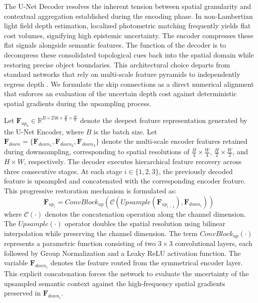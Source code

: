 \documentclass[lettersize,journal]{IEEEtran}
\begin{document}
The U-Net Decoder resolves the inherent tension between spatial granularity and contextual aggregation established during the encoding phase. In non-Lambertian light field depth estimation, localized photometric matching frequently yields flat cost volumes, signifying high epistemic uncertainty. The encoder compresses these flat signals alongside semantic features. The function of the decoder is to decompress these consolidated topological cues back into the spatial domain while restoring precise object boundaries. This architectural choice departs from standard networks that rely on multi-scale feature pyramids to independently regress depth \cite{lin2017}. We formulate the skip connections as a direct numerical alignment that enforces an evaluation of the uncertain depth cost against deterministic spatial gradients during the upsampling process.

Let $\mathbf{F}_{up_0} \in \mathbb{R}^{B \times 256 \times \frac{H}{8} \times \frac{W}{8}}$ denote the deepest feature representation generated by the U-Net Encoder, where $B$ is the batch size. Let $\mathbf{F}_{down} = \{\mathbf{F}_{down_1}, \mathbf{F}_{down_2}, \mathbf{F}_{down_3}\}$ denote the multi-scale encoder features retained during downsampling, corresponding to spatial resolutions of $\frac{H}{4} \times \frac{W}{4}$, $\frac{H}{2} \times \frac{W}{2}$, and $H \times W$, respectively. The decoder executes hierarchical feature recovery across three consecutive stages. At each stage $i \in \{1, 2, 3\}$, the previously decoded feature is upsampled and concatenated with the corresponding encoder feature. This progressive restoration mechanism is formulated as:
\begin{equation}
\mathbf{F}_{up_i} = ConvBlock_{up} \left( \mathcal{C} \left( Upsample(\mathbf{F}_{up_{i-1}}), \mathbf{F}_{down_i} \right) \right)
\end{equation}
where $\mathcal{C}(\cdot)$ denotes the concatenation operation along the channel dimension. The $Upsample(\cdot)$ operator doubles the spatial resolution using bilinear interpolation while preserving the channel dimension. The term $ConvBlock_{up}(\cdot)$ represents a parametric function consisting of two $3 \times 3$ convolutional layers, each followed by Group Normalization and a Leaky ReLU activation function. The variable $\mathbf{F}_{down_i}$ denotes the feature routed from the symmetrical encoder layer. This explicit concatenation forces the network to evaluate the uncertainty of the upsampled semantic context against the high-frequency spatial gradients preserved in $\mathbf{F}_{down_i}$.
\end{document}
